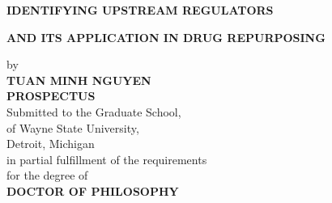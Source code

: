 \centerline{\uppercase{\textbf{Identifying upstream regulators}}}
\vspace{-0.4cm}
\centerline{\uppercase{\textbf{ and its application in drug repurposing}}}

\vskip-0.4cm
\thispagestyle{empty}

\begin{center}
    \vspace{-0.4cm}
    by \\
    {\bf \uppercase{Tuan Minh Nguyen}}\\ %
    {\bf \uppercase{prospectus}}\\  %
    Submitted to the Graduate School,\\
    of Wayne State University,\\
    Detroit, Michigan\\
    in partial fulfillment of the requirements\\
    for the degree of\\
    {\bf DOCTOR OF PHILOSOPHY} %
\end{center}

